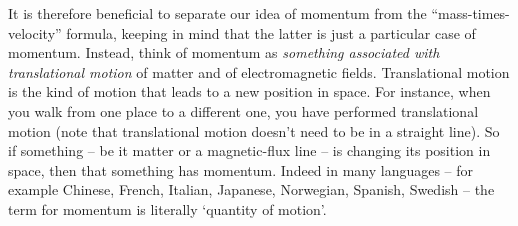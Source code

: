 \documentclass[a4paper,12pt,%
onecolumn,oneside,%
british%
]{memoir}
\renewcommand*{\|}[1][]{\nonscript\:#1\vert\nonscript\:\mathopen{}}
\begin{document}

It is therefore beneficial to separate our idea of momentum from the \enquote{mass-times-velocity} formula, keeping in mind that the latter is just a particular case of momentum. Instead, think of momentum as \emph{something associated with translational motion} of matter and of electromagnetic fields. Translational motion is the kind of motion that leads to a new position in space. For instance, when you walk from one place to a different one, you have performed translational motion (note that translational motion doesn't need to be in a straight line).
So if something -- be it matter or a magnetic-flux line -- is changing its position in space, then that something has momentum. Indeed in many languages -- for example Chinese, French, Italian, Japanese, Norwegian, Spanish, Swedish -- the term for momentum is literally \enquote*{quantity of motion}.
\end{document}
